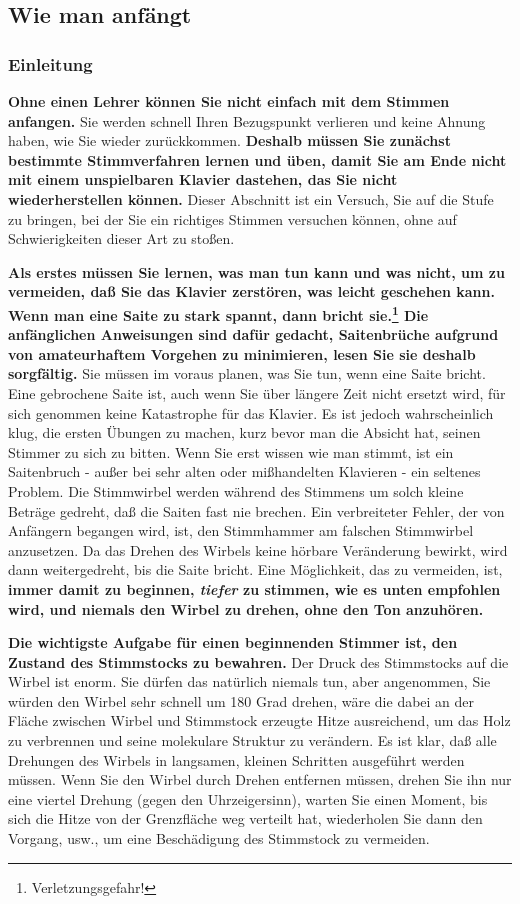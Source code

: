 
\subsection{Wie man anfängt}
\label{c2_5}

\subsubsection{Einleitung}
\label{c2_5a}

\textbf{Ohne einen Lehrer können Sie nicht einfach mit dem Stimmen anfangen.}
Sie werden schnell Ihren Bezugspunkt verlieren und keine Ahnung haben, wie Sie wieder zurückkommen.
\textbf{Deshalb müssen Sie zunächst bestimmte Stimmverfahren lernen und üben, damit Sie am Ende nicht mit einem unspielbaren Klavier dastehen, das Sie nicht wiederherstellen können.}
Dieser Abschnitt ist ein Versuch, Sie auf die Stufe zu bringen, bei der Sie ein richtiges Stimmen versuchen können, ohne auf Schwierigkeiten dieser Art zu stoßen.

\textbf{Als erstes müssen Sie lernen, was man tun kann und was nicht, um zu vermeiden, daß Sie das Klavier zerstören, was leicht geschehen kann.
Wenn man eine Saite zu stark spannt, dann bricht sie.\footnote{Verletzungsgefahr!}
Die anfänglichen Anweisungen sind dafür gedacht, Saitenbrüche aufgrund von amateurhaftem Vorgehen zu minimieren, lesen Sie sie deshalb sorgfältig.}
Sie müssen im voraus planen, was Sie tun, wenn eine Saite bricht.
Eine gebrochene Saite ist, auch wenn Sie über längere Zeit nicht ersetzt wird, für sich genommen keine Katastrophe für das Klavier.
Es ist jedoch wahrscheinlich klug, die ersten Übungen zu machen, kurz bevor man die Absicht hat, seinen Stimmer zu sich zu bitten.
Wenn Sie erst wissen wie man stimmt, ist ein Saitenbruch - außer bei sehr alten oder mißhandelten Klavieren -  ein seltenes Problem.
Die Stimmwirbel werden während des Stimmens um solch kleine Beträge gedreht, daß die Saiten fast nie brechen.
Ein verbreiteter Fehler, der von Anfängern begangen wird, ist, den Stimmhammer am falschen Stimmwirbel anzusetzen.
Da das Drehen des Wirbels keine hörbare Veränderung bewirkt, wird dann weitergedreht, bis die Saite bricht.
Eine Möglichkeit, das zu vermeiden, ist, \textbf{immer damit zu beginnen, \textit{tiefer} zu stimmen, wie es unten empfohlen wird, und niemals den Wirbel zu drehen, ohne den Ton anzuhören.}

\textbf{Die wichtigste Aufgabe für einen beginnenden Stimmer ist, den Zustand des Stimmstocks zu bewahren.}
Der Druck des Stimmstocks auf die Wirbel ist enorm.
Sie dürfen das natürlich niemals tun, aber angenommen, Sie würden den Wirbel sehr schnell um 180 Grad drehen, wäre die dabei an der Fläche zwischen Wirbel und Stimmstock erzeugte Hitze ausreichend, um das Holz zu verbrennen und seine molekulare Struktur zu verändern.
Es ist klar, daß alle Drehungen des Wirbels in langsamen, kleinen Schritten ausgeführt werden müssen.
Wenn Sie den Wirbel durch Drehen entfernen müssen, drehen Sie ihn nur eine viertel Drehung (gegen den Uhrzeigersinn), warten Sie einen Moment, bis sich die Hitze von der Grenzfläche weg verteilt hat, wiederholen Sie dann den Vorgang, usw., um eine Beschädigung des Stimmstock zu vermeiden.

